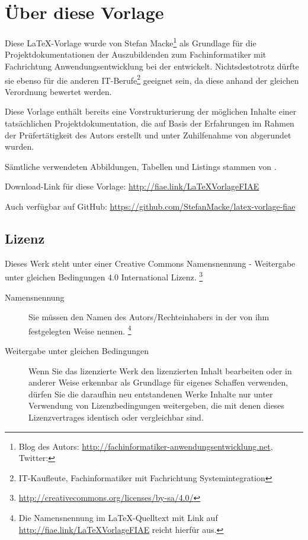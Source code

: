 \section*{Über diese Vorlage}

Diese \LaTeX-Vorlage wurde von Stefan Macke\footnote{Blog des Autors:
\url{http://fachinformatiker-anwendungsentwicklung.net}, Twitter:
} als Grundlage für die Projektdokumentationen der Auszubildenden zum Fachinformatiker mit Fachrichtung
Anwendungsentwicklung bei der \AO entwickelt. Nichtsdestotrotz dürfte sie ebenso für die anderen IT-Berufe\footnote{\zB IT-Kaufleute, Fachinformatiker
mit Fachrichtung Systemintegration \usw} geeignet sein, da diese anhand der gleichen Verordnung bewertet werden.

Diese Vorlage enthält bereits eine Vorstrukturierung der möglichen Inhalte einer tatsächlichen Projektdokumentation, die auf Basis der
Erfahrungen im Rahmen der Prüfertätigkeit des Autors erstellt und unter Zuhilfenahme von \citet{Rohrer2011} abgerundet wurden.

Sämtliche verwendeten Abbildungen, Tabellen und Listings stammen von \citet{Grashorn2010}.

Download-Link für diese Vorlage: \url{http://fiae.link/LaTeXVorlageFIAE}

Auch verfügbar auf GitHub: \url{https://github.com/StefanMacke/latex-vorlage-fiae}

\subsection*{Lizenz}

\begin{center}
\end{center}
Dieses Werk steht unter einer Creative Commons Namensnennung - Weitergabe unter gleichen Bedingungen 4.0 International Lizenz.
\footnote{\url{http://creativecommons.org/licenses/by-sa/4.0/}}

\begin{center}
\end{center}

\begin{description}
	\item[Namensnennung] Sie müssen den Namen des Autors/Rechteinhabers in der von ihm festgelegten Weise nennen.
	\footnote{Die Namensnennung im \LaTeX-Quelltext mit Link auf \url{http://fiae.link/LaTeXVorlageFIAE} reicht hierfür aus.}
	\item[Weitergabe unter gleichen Bedingungen] Wenn Sie das lizenzierte Werk \bzw den lizenzierten Inhalt bearbeiten
	oder in anderer Weise erkennbar als Grundlage für eigenes Schaffen verwenden, dürfen Sie die daraufhin neu entstandenen
	Werke \bzw Inhalte nur unter Verwendung von Lizenzbedingungen weitergeben, die mit denen dieses Lizenzvertrages identisch oder vergleichbar sind.
\end{description}

